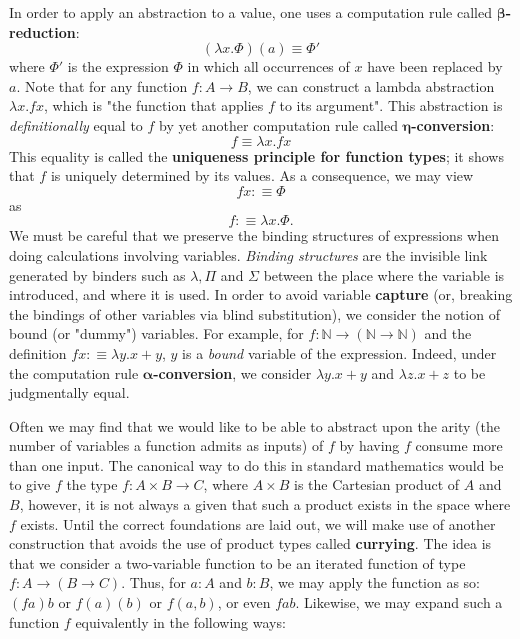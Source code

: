\documentclass[letterpaper, 10 pt, conference]{ieeeconf}  %
\begin{document}
In order to apply an abstraction to a value, one uses a computation rule called $\mathbf{\beta}$\textbf{-reduction}: 
\begin{equation}
    (\lambda x. \Phi)(a) \equiv \Phi'
\end{equation}
where $\Phi'$ is the expression $\Phi$ in which all occurrences of $x$ have been replaced by $a$. Note that for any function $f: A \rightarrow B$, we can construct a lambda abstraction $\lambda x. f x$, which is "the function that applies $f$ to its argument". This abstraction is \textit{definitionally} equal to $f$ by yet another computation rule called $\mathbf{\eta}$\textbf{-conversion}: 
\begin{equation}
    f \equiv \lambda x. f x
\end{equation}
This equality is called the \textbf{uniqueness principle for function types}; it shows that $f$ is uniquely determined by its values. As a consequence, we may view
\begin{equation}
    f x :\equiv \Phi
\end{equation}
as
\begin{equation}
    f :\equiv \lambda x.\Phi.
\end{equation}
We must be careful that we preserve the binding structures of expressions when doing calculations involving variables. \textit{Binding structures} are the invisible link generated by binders such as $\lambda, \Pi$ and $\Sigma$ between the place where the variable is introduced, and where it is used. In order to avoid variable \textbf{capture} (or, breaking the bindings of other variables via blind substitution), we consider the notion of bound (or "dummy") variables. For example, for $f : \mathbb{N} \rightarrow (\mathbb{N} \rightarrow \mathbb{N})$ and the definition $f x :\equiv \lambda y. x + y$, $y$ is a \textit{bound} variable of the expression. Indeed, under the computation rule $\mathbf{\alpha}$\textbf{-conversion}, we consider $\lambda y. x + y$ and $\lambda z. x + z$ to be judgmentally equal.

Often we may find that we would like to be able to abstract upon the arity (the number of variables a function admits as inputs) of $f$ by having $f$ consume more than one input. The canonical way to do this in standard mathematics would be to give $f$ the type $f: A\times B \rightarrow C$, where $A \times B$ is the Cartesian product of $A$ and $B$, however, it is not always a given that such a product exists in the space where $f$ exists. Until the correct foundations are laid out, we will make use of another construction that avoids the use of product types called \textbf{currying}. The idea is that we consider a two-variable function to be an iterated function of type $f: A \rightarrow (B \rightarrow C)$. Thus, for $a : A$ and $b : B$, we may apply the function as so: $(f a) b$ or $f(a)(b)$ or $f(a, b)$, or even $f a b$. Likewise, we may expand such a function $f$ equivalently in the following ways:
\end{document}

